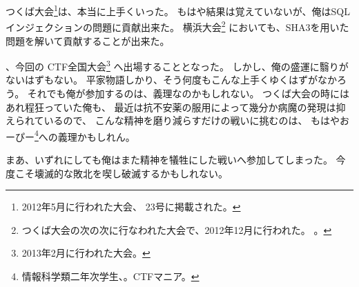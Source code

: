 つくば大会\footnote{2012年5月に行われた大会、{\WORD} 23号に掲載された。}は、本当に上手くいった。
もはや結果は覚えていないが、俺はSQLインジェクションの問題に貢献出来た。
横浜大会\footnote{%
つくば大会の次の次に行なわれた大会で、2012年12月に行われた。
。}%
においても、SHA3を用いた問題を解いて貢献することが出来た。

、今回の{\SECCON} CTF全国大会\footnote{2013年2月に行われた大会。}%
へ出場することとなった。
しかし、俺の盛運に翳りがないはずもない。
平家物語しかり、そう何度もこんな上手くゆくはずがなかろう。
それでも俺が参加するのは、義理なのかもしれない。
つくば大会の時にはあれ程狂っていた俺も、
最近は抗不安薬の服用によって幾分か病魔の発現は抑えられているので、
こんな精神を磨り減らすだけの戦いに挑むのは、
もはやおーぴー\footnote{情報科学類二年次学生、。CTFマニア。}への義理かもしれん。

まあ、いずれにしても俺はまた精神を犠牲にした戦いへ参加してしまった。
今度こそ壊滅的な敗北を喫し破滅するかもしれない。
